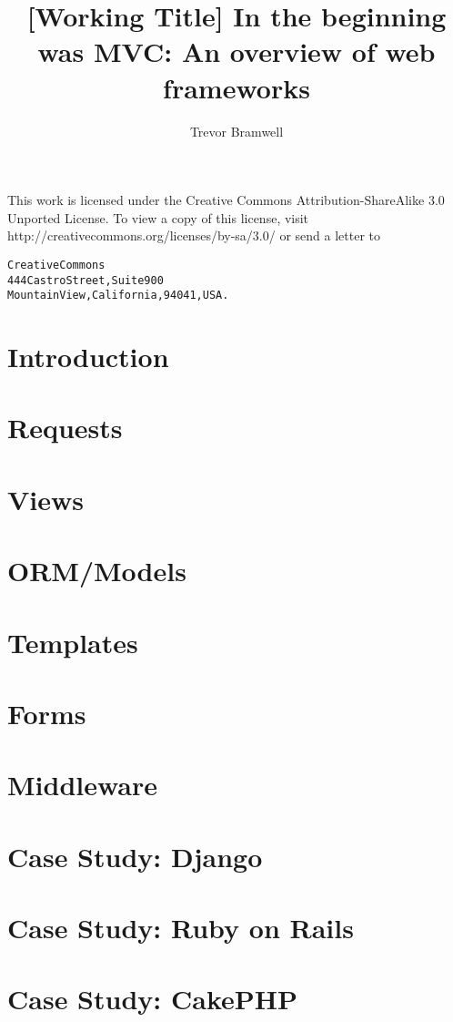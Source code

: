 \documentclass[12pt]{article}
\title{[Working Title] In the beginning was MVC: An overview of web
frameworks}
\author{Trevor Bramwell}
\date{}
\newcommand{\blankpage}{
    \newpage
    \thispagestyle{empty}
    \mbox{}
    \newpage
}
\begin{document}
\maketitle

\newpage

This work is licensed under the Creative Commons 
Attribution-ShareAlike 3.0 Unported License.
To view a copy of this license, visit \\
http://creativecommons.org/licenses/by-sa/3.0/
or send a letter to

\begin{alltt}
Creative Commons
444 Castro Street, Suite 900
Mountain View, California, 94041, USA.
\end{alltt}


\blankpage

\tableofcontents

\section{Introduction}
\section{Requests}
\section{Views}
\section{ORM/Models}
\section{Templates}
\section{Forms}
\section{Middleware}

\section{Case Study: Django}
\section{Case Study: Ruby on Rails}
\section{Case Study: CakePHP}
\end{document}
